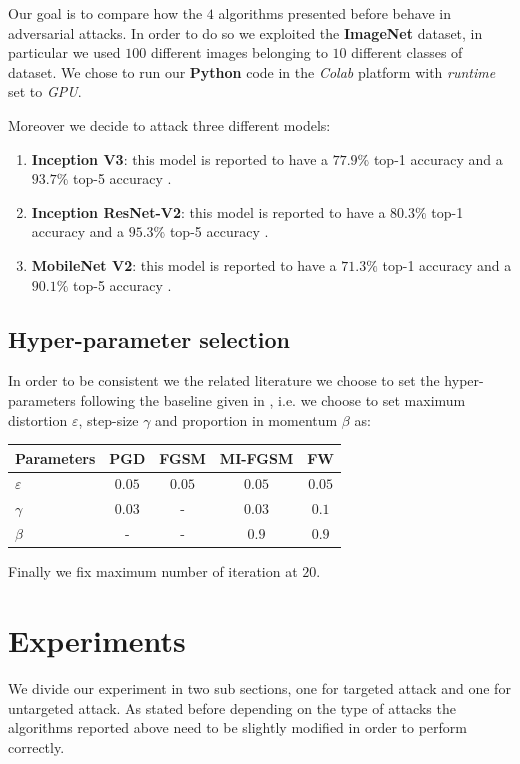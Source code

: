\documentclass[10pt,twocolumn,letterpaper, english]{article}
\theoremstyle{definition}
\theoremstyle{plain}
\theoremstyle{plain}
\theoremstyle{plain}
\theoremstyle{plain}
\theoremstyle{remark}
\theoremstyle{remark}
\theoremstyle{definition}
\theoremstyle{definition}
\theoremstyle{definition}
\theoremstyle{definition}
\renewcommand{\epsilon}{\varepsilon}
\begin{document}
Our goal is to compare how the $4$ algorithms presented before behave in adversarial attacks. In order to do so we exploited the \textbf{ImageNet} dataset, in particular we used $100$ different images belonging to $10$ different classes of dataset. We chose to run our \textbf{Python} code in the \textit{Colab} platform with \textit{runtime} set to \textit{GPU}.

Moreover we decide to attack three different models: 
\begin{enumerate}
    \item \textbf{Inception V3}: this model is reported to have a $77.9\%$ top-1 accuracy and a $93.7\%$ top-5 accuracy \cite{keras}.
    \item \textbf{Inception ResNet-V2}: this model is reported to have a $80.3\%$ top-1 accuracy and a	$95.3\%$ top-5 accuracy \cite{keras}.
    \item \textbf{MobileNet V2}: this model is reported to have a $71.3\%$ top-1 accuracy and a	$90.1\%$ top-5 accuracy \cite{keras}.
    
\end{enumerate}


\subsection{Hyper-parameter selection}

In order to be consistent we the related literature we choose to set the hyper-parameters following the baseline given in \cite{frank}, i.e. we choose to set maximum distortion $\epsilon$, step-size $\gamma$ and proportion in momentum $\beta$ as:


\begin{center}
    \begin{tabular}{l|c|c|c|c}
    \hline
     Parameters & PGD & FGSM & MI-FGSM & FW \\
     \hline
     $\epsilon$ & $0.05$ & $0.05$ & $0.05$ & $0.05$  \\
     
     $\gamma$ & $0.03$ & - & $0.03$ & $0.1$ \\
     
     $\beta$ & - & - & $0.9$ & $0.9$  \\
    \hline
   \end{tabular}
\end{center}

Finally we fix maximum number of iteration at $20$.


\section{Experiments}
We divide our experiment in two sub sections, one for targeted attack and one for untargeted attack. As stated before depending on the type of attacks the algorithms reported above need to be slightly modified in order to perform correctly.
\end{document}
